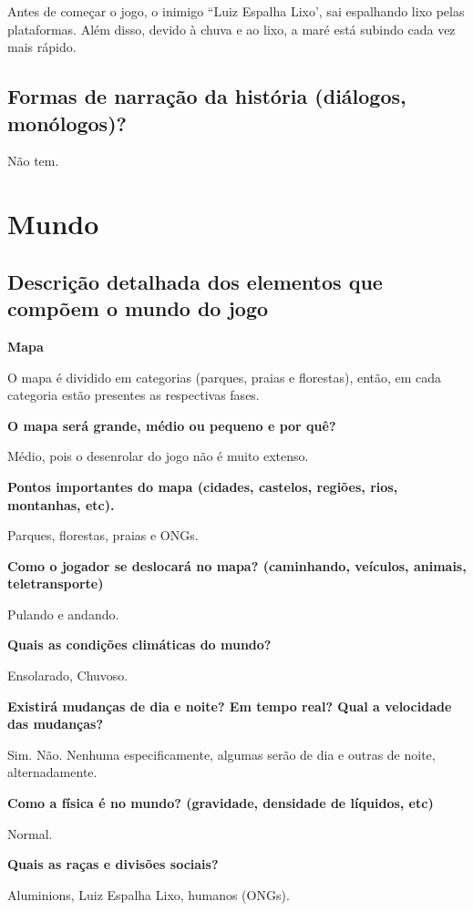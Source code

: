 \documentclass[]{scrartcl}
\begin{document}
Antes de começar o jogo, o inimigo “Luiz Espalha Lixo’, sai espalhando lixo pelas plataformas. Além disso, devido à chuva e ao lixo, a maré está subindo cada vez mais rápido.

\subsection{Formas de narração da história (diálogos, monólogos)?}

Não tem.

\section{Mundo}

\subsection{Descrição detalhada dos elementos que compõem o mundo
do jogo}

\noindent\textbf{Mapa}

O mapa é dividido em categorias (parques, praias e florestas), então, em cada categoria estão presentes as respectivas fases.

\noindent\textbf{O mapa será grande, médio ou pequeno e por quê?}

Médio, pois o desenrolar do jogo não é muito extenso.

\noindent\textbf{Pontos importantes do mapa (cidades, castelos, regiões, rios, montanhas, etc).}

Parques, florestas, praias e ONGs.

\noindent\textbf{Como o jogador se deslocará no mapa? (caminhando, veículos, animais, teletransporte)}

Pulando e andando.

\noindent\textbf{Quais as condições climáticas do mundo?}

Ensolarado, Chuvoso.

\noindent\textbf{Existirá mudanças de dia e noite? Em tempo real? Qual a
velocidade das mudanças?}

Sim. Não. Nenhuma especificamente, algumas serão de dia e outras de noite, alternadamente.

\noindent\textbf{Como a física é no mundo? (gravidade, densidade de líquidos, etc)}

Normal.

\noindent\textbf{Quais as raças e divisões sociais?}

Aluminions, Luiz Espalha Lixo, humanos (ONGs).
\end{document}
